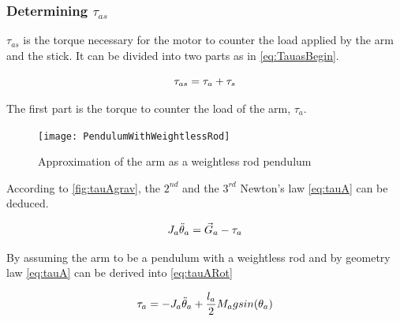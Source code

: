 \subsubsection*{Determining $\tau_{as}$}

$\tau_{as}$ is the torque necessary for the motor to counter the load applied by the arm and the stick. It can be divided into two parts as in \autoref{eq:TauasBegin}.

\begin{equation}\label{eq:TauasBegin}
	\tau_{as}=\tau_a+\tau_s \addunit{\newton\meter}
\end{equation}
\startexplain
{}
\stopexplain

The first part is the torque to counter the load of the arm, $\tau_a$.
 
 \begin{figure}[htbp]
 	\centering
 	\texttt{[image: PendulumWithWeightlessRod]}
 	\caption{Approximation of the arm as a weightless rod pendulum}\label{fig:tauAgrav}
 \end{figure}
 \startexplain
 \stopexplain
 
According to \autoref{fig:tauAgrav}, the $2^{nd}$ and the $3^{rd}$ Newton's law \autoref{eq:tauA} can be deduced.

\begin{equation}\label{eq:tauA}
	J_a \ddot{\theta}_a=\vec{G}_a-\tau_a \addunit{\newton\meter}
\end{equation}
\startexplain
{}
\stopexplain

By assuming the arm to be a pendulum with a weightless rod and by geometry law \autoref{eq:tauA} can be derived into \autoref{eq:tauARot}

\begin{equation}\label{eq:tauARot}
	\tau_a=-J_a\ddot{\theta}_a+\frac{l_a}{2}M_a g sin(\theta_a) \addunit{\newton\meter}
\end{equation}

